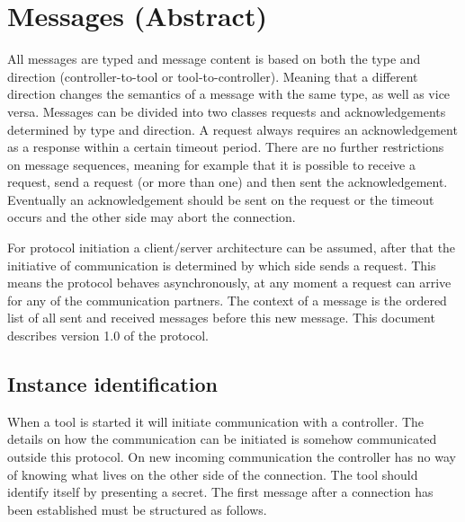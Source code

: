 \documentclass{article}
\begin{document}
  
 \section{Messages (Abstract)} \label{s:message_definitions}

  All messages are typed and message content is based on both the type and
  direction (controller-to-tool or tool-to-controller). Meaning that a
  different direction changes the semantics of a message with the same type, as
  well as vice versa. Messages can be divided into two classes requests and
  acknowledgements determined by type and direction. A request always requires
  an acknowledgement as a response within a certain timeout period. There are
  no further restrictions on message sequences, meaning for example that it is
  possible to receive a request, send a request (or more than one) and then
  sent the acknowledgement. Eventually an acknowledgement should be sent on the
  request or the timeout occurs and the other side may abort the connection.
  
  For protocol initiation a client/server architecture can be assumed, after
  that the initiative of communication is determined by which side sends a
  request. This means the protocol behaves asynchronously, at any moment a
  request can arrive for any of the communication partners. The context of a
  message is the ordered list of all sent and received messages before this new
  message.  This document describes version 1.0 of the protocol.

  \subsection{Instance identification}

   When a tool is started it will initiate communication with a controller.
   The details on how the communication can be initiated is somehow
   communicated outside this protocol. On new incoming communication the
   controller has no way of knowing what lives on the other side of the
   connection. The tool should identify itself by presenting a secret. The
   first message after a connection has been established must be structured as
   follows.
   
\end{document}
